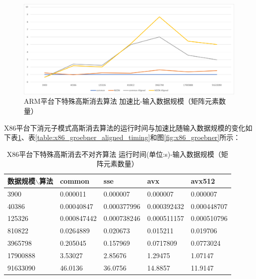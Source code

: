 \documentclass[a4paper]{article}
\begin{document}
\begin{figure}[H]
    \centering
    \includegraphics[width=6.2in]{fig/arm_groebner.png}
    \caption{ARM平台下特殊高斯消去算法 加速比-输入数据规模（矩阵元素数量）}
    \label{fig:arm_groebner}
\end{figure}

X86平台下消元子模式高斯消去算法的运行时间与加速比随输入数据规模的变化如下表\ref{table:x86_groebner_unaligned_timing}、表\ref{table:x86_groebner_aligned_timing}和图\ref{fig:x86_groebner}所示：

\begin{table}[H]
    \centering
    \begin{tabular}{|l|l|l|l|l|}
    \hline
        数据规模$\backslash$算法 & common & sse & avx & avx512 \\ \hline
        3900 & 0.000011 & 0.000007 & 0.000007 & 0.000007 \\ \hline
        40386 & 0.00040847 & 0.000377996 & 0.000392432 & 0.000448707 \\ \hline
        125326 & 0.000847442 & 0.000738246 & 0.000511157 & 0.000510796 \\ \hline
        810822 & 0.0264889 & 0.020673 & 0.015211 & 0.019706 \\ \hline
        3965798 & 0.205045 & 0.157969 & 0.0717809 & 0.0773024 \\ \hline
        17900888 & 3.53027 & 2.85676 & 1.29475 & 1.07147 \\ \hline
        91633090 & 46.0136 & 36.0756 & 14.8857 & 11.9147 \\ \hline
    \end{tabular}
    \caption{X86平台下特殊高斯消去不对齐算法 运行时间(单位:s)-输入数据规模（矩阵元素数量）}
    \label{table:x86_groebner_unaligned_timing}
\end{table}
\end{document}

